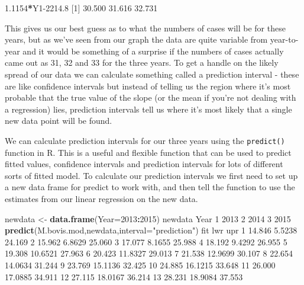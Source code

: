 \documentclass[
]{book}
\newenvironment{Shaded}{\begin{snugshade}}{\end{snugshade}}
\newcommand{\DataTypeTok}[1]{\textcolor[rgb]{0.13,0.29,0.53}{#1}}
\newcommand{\DecValTok}[1]{\textcolor[rgb]{0.00,0.00,0.81}{#1}}
\newcommand{\FloatTok}[1]{\textcolor[rgb]{0.00,0.00,0.81}{#1}}
\newcommand{\KeywordTok}[1]{\textcolor[rgb]{0.13,0.29,0.53}{\textbf{#1}}}
\newcommand{\NormalTok}[1]{#1}
\newcommand{\OperatorTok}[1]{\textcolor[rgb]{0.81,0.36,0.00}{\textbf{#1}}}
\newcommand{\StringTok}[1]{\textcolor[rgb]{0.31,0.60,0.02}{#1}}
\begin{document}
\begin{Shaded}
\begin{Highlighting}[]
\FloatTok{1.1154}\OperatorTok{*}\NormalTok{Y1}\FloatTok{-2214.8}
\NormalTok{[}\DecValTok{1}\NormalTok{] }\FloatTok{30.500} \FloatTok{31.616} \FloatTok{32.731}
\end{Highlighting}
\end{Shaded}

This gives us our best guess as to what the numbers of cases will be for these years, but as we've seen from our graph the data are quite variable from year-to-year and it would be something of a surprise if the numbers of cases actually came out as 31, 32 and 33 for the three years. To get a handle on the likely spread of our data we can calculate something called a prediction interval - these are like confidence intervals but instead of telling us the region where it's most probable that the true value of the slope (or the mean if you're not dealing with a regression) lies, prediction intervals tell us where it's most likely that a single new data point will be found.

We can calculate prediction intervals for our three years using the \texttt{predict()} function in R. This is a useful and flexible function that can be used to predict fitted values, confidence intervals and prediction intervals for lots of different sorts of fitted model. To calculate our prediction intervals we first need to set up a new data frame for predict to work with, and then tell the function to use the estimates from our linear regression on the new data.

\begin{Shaded}
\begin{Highlighting}[]
\NormalTok{newdata <-}\StringTok{ }\KeywordTok{data.frame}\NormalTok{(}\DataTypeTok{Year=}\DecValTok{2013}\OperatorTok{:}\DecValTok{2015}\NormalTok{)}
\NormalTok{newdata}
\NormalTok{  Year}
\DecValTok{1} \DecValTok{2013}
\DecValTok{2} \DecValTok{2014}
\DecValTok{3} \DecValTok{2015}
\KeywordTok{predict}\NormalTok{(M.bovis.mod,newdata,}\DataTypeTok{interval=}\StringTok{"prediction"}\NormalTok{)}
\NormalTok{      fit     lwr    upr}
\DecValTok{1}  \FloatTok{14.846}  \FloatTok{5.5238} \FloatTok{24.169}
\DecValTok{2}  \FloatTok{15.962}  \FloatTok{6.8629} \FloatTok{25.060}
\DecValTok{3}  \FloatTok{17.077}  \FloatTok{8.1655} \FloatTok{25.988}
\DecValTok{4}  \FloatTok{18.192}  \FloatTok{9.4292} \FloatTok{26.955}
\DecValTok{5}  \FloatTok{19.308} \FloatTok{10.6521} \FloatTok{27.963}
\DecValTok{6}  \FloatTok{20.423} \FloatTok{11.8327} \FloatTok{29.013}
\DecValTok{7}  \FloatTok{21.538} \FloatTok{12.9699} \FloatTok{30.107}
\DecValTok{8}  \FloatTok{22.654} \FloatTok{14.0634} \FloatTok{31.244}
\DecValTok{9}  \FloatTok{23.769} \FloatTok{15.1136} \FloatTok{32.425}
\DecValTok{10} \FloatTok{24.885} \FloatTok{16.1215} \FloatTok{33.648}
\DecValTok{11} \FloatTok{26.000} \FloatTok{17.0885} \FloatTok{34.911}
\DecValTok{12} \FloatTok{27.115} \FloatTok{18.0167} \FloatTok{36.214}
\DecValTok{13} \FloatTok{28.231} \FloatTok{18.9084} \FloatTok{37.553}
\end{Highlighting}
\end{Shaded}
\end{document}
